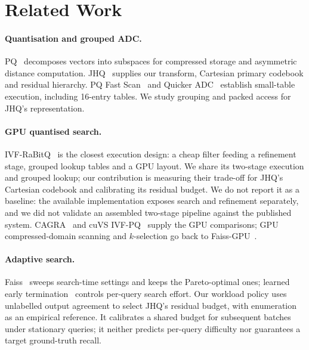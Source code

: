 \section{Related Work}
\label{sec:related}\label{sec:relatedwork}
\paragraph{Quantisation and grouped ADC.}
PQ~\cite{pq} decomposes vectors into subspaces for compressed storage and
asymmetric distance computation. JHQ~\cite{jhq} supplies our transform,
Cartesian primary codebook and residual hierarchy. PQ Fast
Scan~\cite{fastscan} and Quicker ADC~\cite{quickeradc} establish small-table
execution, including 16-entry tables. We study grouping and packed access for
JHQ's representation. 

\paragraph{GPU quantised search.}
IVF-RaBitQ~\cite{ivfrabitq} is the closest execution design: a cheap filter
feeding a refinement stage, grouped lookup tables and a GPU layout. We share its
two-stage execution and grouped lookup; our contribution is measuring their
trade-off for JHQ's Cartesian codebook and calibrating its residual budget. We do not report it as a baseline: the available implementation exposes
search and refinement separately, and we did not validate an assembled
two-stage pipeline against the published system. CAGRA~\cite{cagra} and cuVS
IVF-PQ~\cite{cuvs} supply the GPU comparisons; GPU compressed-domain scanning
and $k$-selection go back to Faiss-GPU~\cite{faissgpu}.

\paragraph{Adaptive search.}
Faiss~\cite{faisslib} sweeps search-time settings and keeps the
Pareto-optimal ones; learned early termination~\cite{earlyterm} controls
per-query search effort. Our workload
policy uses unlabelled output agreement to select JHQ's residual budget, with
enumeration as an empirical reference. It calibrates a shared budget for
subsequent batches under stationary queries; it neither predicts per-query
difficulty nor guarantees a target ground-truth recall.
